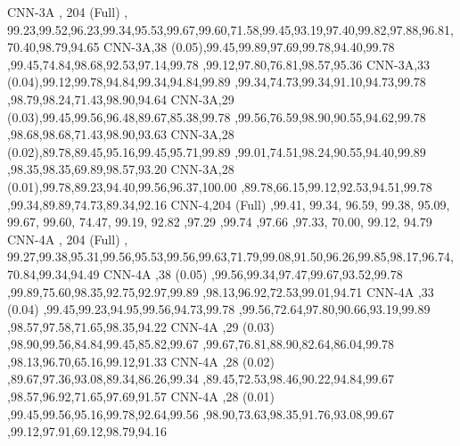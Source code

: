 \documentclass[journal]{IEEEtran}
\begin{document}
\begin{table*}[ht!]
{CNN-3A  , 204 (Full) , 99.23,99.52,96.23,99.34,95.53,99.67,99.60,71.58,99.45,93.19,97.40,99.82,97.88,96.81,70.40,98.79,94.65
CNN-3A,38 (0.05),99.45,99.89,97.69,99.78,94.40,99.78	,99.45,74.84,98.68,92.53,97.14,99.78	,99.12,97.80,76.81,98.57,95.36
CNN-3A,33 (0.04),99.12,99.78,94.84,99.34,94.84,99.89	,99.34,74.73,99.34,91.10,94.73,99.78	,98.79,98.24,71.43,98.90,94.64
CNN-3A,29 (0.03),99.45,99.56,96.48,89.67,85.38,99.78	,99.56,76.59,98.90,90.55,94.62,99.78	,98.68,98.68,71.43,98.90,93.63
CNN-3A,28 (0.02),89.78,89.45,95.16,99.45,95.71,99.89	,99.01,74.51,98.24,90.55,94.40,99.89	,98.35,98.35,69.89,98.57,93.20
CNN-3A,28 (0.01),99.78,89.23,94.40,99.56,96.37,100.00	,89.78,66.15,99.12,92.53,94.51,99.78	,99.34,89.89,74.73,89.34,92.16
CNN-4,204 (Full) ,99.41,	99.34,	96.59,	99.38,	95.09,	99.67,	99.60,	74.47,	99.19,	92.82	,97.29	,99.74	,97.66	,97.33,	70.00,	99.12,	94.79
CNN-4A  , 204 (Full) , 99.27,99.38,95.31,99.56,95.53,99.56,99.63,71.79,99.08,91.50,96.26,99.85,98.17,96.74,70.84,99.34,94.49
CNN-4A	,38 (0.05)	,99.56,99.34,97.47,99.67,93.52,99.78	,99.89,75.60,98.35,92.75,92.97,99.89	,98.13,96.92,72.53,99.01,94.71
CNN-4A	,33 (0.04)	,99.45,99.23,94.95,99.56,94.73,99.78	,99.56,72.64,97.80,90.66,93.19,99.89	,98.57,97.58,71.65,98.35,94.22
CNN-4A	,29 (0.03)	,98.90,99.56,84.84,99.45,85.82,99.67	,99.67,76.81,88.90,82.64,86.04,99.78	,98.13,96.70,65.16,99.12,91.33
CNN-4A	,28 (0.02)	,89.67,97.36,93.08,89.34,86.26,99.34	,89.45,72.53,98.46,90.22,94.84,99.67	,98.57,96.92,71.65,97.69,91.57
CNN-4A	,28 (0.01)	,99.45,99.56,95.16,99.78,92.64,99.56	,98.90,73.63,98.35,91.76,93.08,99.67	,99.12,97.91,69.12,98.79,94.16
}
\end{table*}
\end{document}
